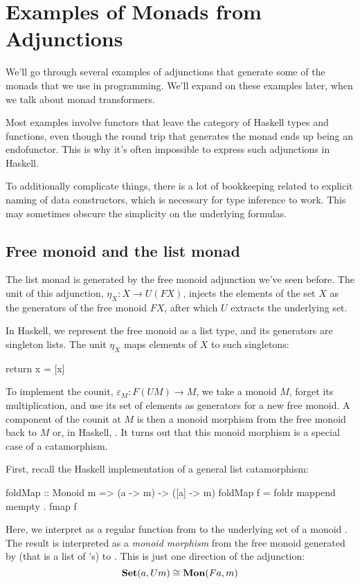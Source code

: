 \documentclass[DaoFP]{subfiles}
\begin{document}
\section{Examples of Monads from Adjunctions}

We'll go through several examples of adjunctions that generate some of the monads that we use in programming. We'll expand on these examples later, when we talk about monad transformers.

Most examples involve functors that leave the category of Haskell types and functions, even though the round trip that generates the monad ends up being an endofunctor. This is why it's often impossible to express such adjunctions in Haskell. 

To additionally complicate things, there is a lot of bookkeeping related to explicit naming of data constructors, which is necessary for type inference to work. This may sometimes obscure the simplicity on the underlying formulas.

\subsection{Free monoid and the list monad}
The list monad is generated by the free monoid adjunction we've seen before. The unit of this adjunction, $\eta_X \colon X \to U (F X)$, injects the elements of the set $X$ as the generators of the free monoid $F X$, after which $U$ extracts the underlying set. 

In Haskell, we represent the free monoid as a list type, and its generators are singleton lists. The unit $\eta_X$ maps elements of $X$ to such singletons:
\begin{haskell}
return x = [x]
\end{haskell}
To implement the counit, $\varepsilon_M \colon F (U M) \to M$, we take a monoid $M$, forget its multiplication, and use its set of elements as generators for a new free monoid. A component of the counit at $M$ is then a monoid morphism from the free monoid back to $M$ or, in Haskell, . It turns out that this monoid morphism is a special case of a catamorphism. 

First, recall the Haskell implementation of a general list catamorphism:
\begin{haskell}
foldMap :: Monoid m => (a -> m) -> ([a] -> m)
foldMap f = foldr mappend mempty . fmap f
\end{haskell}
Here, we interpret  as a regular function from  to the underlying set of a monoid . The result is interpreted as a \emph{monoid morphism} from the free monoid generated by  (that is a list of 's) to . This is just one direction of the adjunction:
\[ \mathbf{Set} (a, U m) \cong \mathbf{Mon} (F a, m) \]
\end{document}
